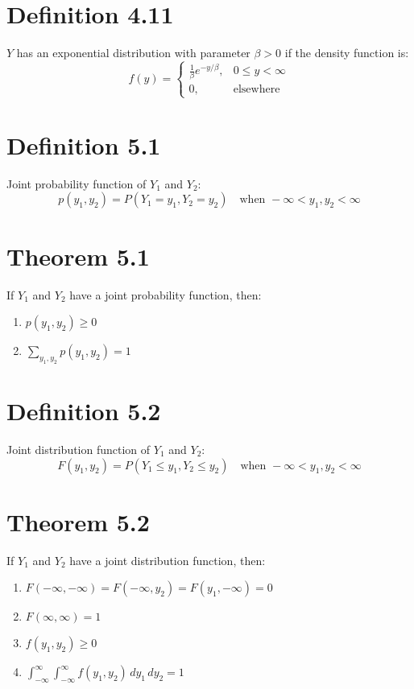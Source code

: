 \documentclass[12pt]{article}
\begin{document}
\section{Definition 4.11}
$Y$ has an exponential distribution with parameter $\beta > 0$ if the density function is:
\[
f(y) = \begin{cases} \frac{1}{\beta} e^{-y/\beta}, & 0 \leq y < \infty \\ 0, & \text{elsewhere} \end{cases}
\]


\section{Definition 5.1}
Joint probability function of $Y_1$ and $Y_2$:
\[
p(y_1, y_2) = P(Y_1 = y_1, Y_2 = y_2) \quad \text{when } -\infty < y_1, y_2 < \infty
\]

\section{Theorem 5.1}
If $Y_1$ and $Y_2$ have a joint probability function, then:
\begin{enumerate}
  \item $p(y_1, y_2) \geq 0$
  \item $\sum_{y_1, y_2} p(y_1, y_2) = 1$
\end{enumerate}

\section{Definition 5.2}
Joint distribution function of $Y_1$ and $Y_2$:
\[
F(y_1, y_2) = P(Y_1 \leq y_1, Y_2 \leq y_2) \quad \text{when } -\infty < y_1, y_2 < \infty
\]


\section{Theorem 5.2}
If $Y_1$ and $Y_2$ have a joint distribution function, then:
\begin{enumerate}
  \item $F(-\infty, -\infty) = F(-\infty, y_2) = F(y_1, -\infty) = 0$
  \item $F(\infty, \infty) = 1$
  \item $f(y_1, y_2) \geq 0$
  \item $\int_{-\infty}^{\infty} \int_{-\infty}^{\infty} f(y_1, y_2) \, dy_1 \, dy_2 = 1$
\end{enumerate}
\end{document}
